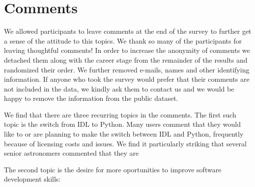\section{Comments}
\label{sec:comments}

We allowed participants to leave comments at the end of the survey to further get a sense of the attitude to this topics. We thank so many of the participants for leaving thoughtful comments! In order to increase the anonymity of comments we detached them along with the career stage from the remainder of the results and randomized their order. We further removed e-mails, names and other identifying information. If anyone who took the survey would prefer that their comments are not included in the data, we kindly ask them to contact us and we would be happy to remove the information from the public dataset. 

We find that there are three recurring topics in the comments. The first such topic is the switch from IDL to Python. Many users comment that they would like to or are planning to make the switch between IDL and Python, frequently because of licensing costs and issues. We find it particularly striking that several senior astronomers commented that they are 

The second topic is the desire for more oportunities to improve software development skills:

